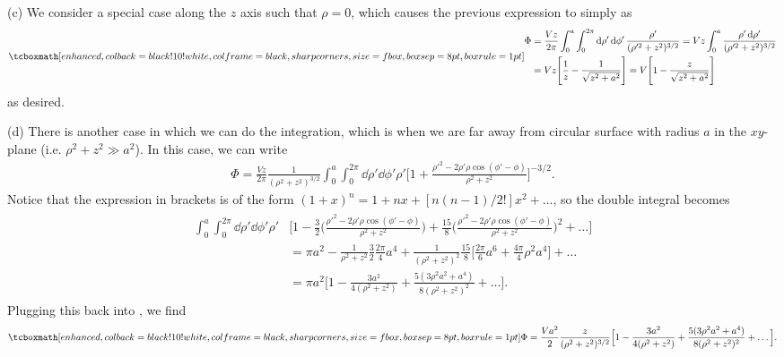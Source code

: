 {(c) We consider a special case along the $z$ axis such that $\rho = 0$, which causes the previous expression to simply as
\begin{eqnarray}
    \eqbox{
    \begin{aligned}
        \Phi &= \frac{V z}{2 \pi} \int_{0}^{a} \int_{0}^{2 \pi} \dd{\rho'} \dd{\phi'} \frac{\rho'}{(\rho'^2 + z^2)^{3/2}} = V z \int_{0}^{a} \frac{\rho' \dd{\rho'}}{(\rho'^2 + z^2)^{3/2}} \\
        &= Vz \Bigg[ \frac{1}{z} - \frac{1}{\sqrt{z^2 + a^2}} \Bigg] = V \Bigg[ 1 - \frac{z}{\sqrt{z^2 + a^2}} \Bigg]
    \end{aligned}
    }
\end{eqnarray}
as desired.

(d) There is another case in which we can do the integration, which is when we are far away from circular surface with radius $a$ in the $xy$-plane (i.e. $\rho^2 + z^2 \gg a^2$).
In this case, we can write
\begin{eqnarray}
    \label{eq:prob1c}
    \Phi = \frac{V z}{2 \pi} \frac{1}{(\rho^2 + z^2)^{3/2}} \int_{0}^{a} \int_{0}^{2 \pi} \dd{\rho'} \dd{\phi'} \rho' \Bigg[ 1 + \frac{\rho'^2 - 2 \rho' \rho \cos{(\phi' - \phi)}}{\rho^2 + z^2} \Bigg]^{-3/2}
.\end{eqnarray}
Notice that the expression in brackets is of the form $(1 + x)^{n} = 1 + nx + [n(n-1)/2!] x^2 + \ldots $, so the double integral becomes
\begin{eqnarray}
    \begin{aligned}
        \int_{0}^{a} \int_{0}^{2 \pi} \dd{\rho'} \dd{\phi'} \rho' &\Bigg[ 1  - \frac{3}{2} \Big( \frac{\rho'^2 - 2 \rho' \rho \cos{(\phi' - \phi)}}{\rho^2 + z^2} \Big) + \frac{15}{8} \Big( \frac{\rho'^2 - 2 \rho' \rho \cos{(\phi' - \phi)}}{\rho^2 + z^2} \Big)^2 + \ldots \Bigg] \\
        &= \pi a^2 - \frac{1}{\rho^2 + z^2} \frac{3}{2} \frac{2 \pi}{4} a^{4} + \frac{1}{(\rho^2 + z^2)^{2}} \frac{15}{8} \Big[ \frac{2 \pi}{6} a^{6} + \frac{4 \pi}{4} \rho^2 a^4 \Big] + \ldots \\
        &= \pi a^2 \Big[ 1 - \frac{3 a^2}{4(\rho^2 + z^2)} + \frac{5(3 \rho^2 a^2 + a^{4})}{8(\rho^2 + z^2)^2} + \ldots \Big]
    .\end{aligned}
\end{eqnarray}
Plugging this back into , we find
\begin{eqnarray}
   \eqbox{
       \Phi = \frac{V a^2}{2} \frac{z}{(\rho^2 + z^2)^{3/2}} \Big[ 1 - \frac{3 a^2}{4(\rho^2 + z^2)} + \frac{5(3 \rho^2 a^2 + a^{4})}{8(\rho^2 + z^2)^2} + \ldots \Big]
   } 
.\end{eqnarray}

}
